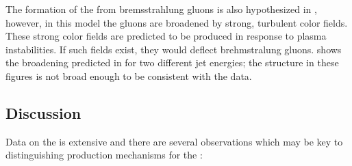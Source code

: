 The formation of the \ridge from bremsstrahlung gluons is also hypothesized in \cite{Majumder:2006wi}, however, in this model the gluons are broadened by strong, turbulent color fields.  These strong color fields are predicted to be produced in response to plasma instabilities.  If such fields exist, they would deflect brehmstralung gluons.   shows the broadening predicted in \cite{Majumder:2006wi} for two different jet energies; the structure in these figures is not broad enough to be consistent with the data.

\subsection{Discussion}
Data on the \ridge is extensive and there are several observations which may be key to distinguishing production mechanisms for the \ridge:
